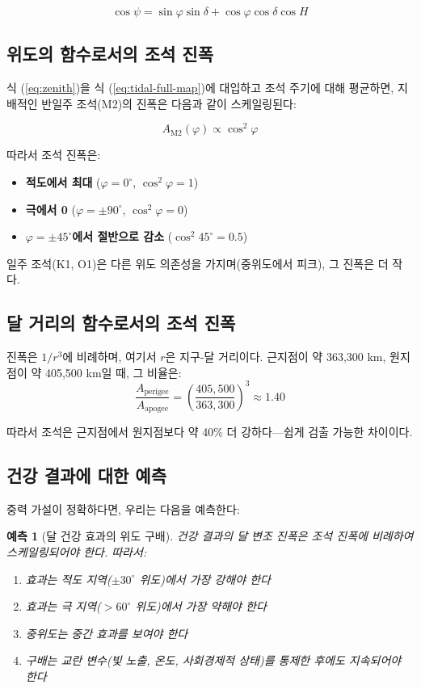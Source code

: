 \documentclass[12pt,a4paper]{article}
\newtheorem{prediction}[theorem]{예측}
\theoremstyle{remark}
\begin{document}
	\begin{equation}
		\cos\psi = \sin\varphi \sin\delta + \cos\varphi \cos\delta \cos H
		\label{eq:zenith}
	\end{equation}
	
	\subsection{위도의 함수로서의 조석 진폭}
	
	식 (\ref{eq:zenith})을 식 (\ref{eq:tidal-full-map})에 대입하고 조석 주기에 대해 평균하면, 지배적인 반일주 조석(M2)의 진폭은 다음과 같이 스케일링된다:
	
	\begin{equation}
		A_{\text{M2}}(\varphi) \propto \cos^2\varphi
		\label{eq:amplitude-latitude}
	\end{equation}
	
	따라서 조석 진폭은:
	\begin{itemize}
		\item \textbf{적도에서 최대} ($\varphi = 0^\circ$, $\cos^2\varphi = 1$)
		\item \textbf{극에서 0} ($\varphi = \pm 90^\circ$, $\cos^2\varphi = 0$)
		\item \textbf{$\varphi = \pm 45^\circ$에서 절반으로 감소} ($\cos^2 45^\circ = 0.5$)
	\end{itemize}
	
	일주 조석(K1, O1)은 다른 위도 의존성을 가지며(중위도에서 피크), 그 진폭은 더 작다.
	
	\subsection{달 거리의 함수로서의 조석 진폭}
	
	진폭은 $1/r^3$에 비례하며, 여기서 $r$은 지구-달 거리이다. 근지점이 약 363,300 km, 원지점이 약 405,500 km일 때, 그 비율은:
	\[
	\frac{A_{\text{perigee}}}{A_{\text{apogee}}} = \left(\frac{405,500}{363,300}\right)^3 \approx 1.40
	\]
	
	따라서 조석은 근지점에서 원지점보다 약 40\% 더 강하다—쉽게 검출 가능한 차이이다.
	
	\subsection{건강 결과에 대한 예측}
	
	중력 가설이 정확하다면, 우리는 다음을 예측한다:
	
	\begin{prediction}[달 건강 효과의 위도 구배]
		건강 결과의 달 변조 진폭은 조석 진폭에 비례하여 스케일링되어야 한다. 따라서:
		\begin{enumerate}
			\item 효과는 적도 지역(\(\pm 30^\circ\) 위도)에서 가장 강해야 한다
			\item 효과는 극 지역(\(>60^\circ\) 위도)에서 가장 약해야 한다
			\item 중위도는 중간 효과를 보여야 한다
			\item 구배는 교란 변수(빛 노출, 온도, 사회경제적 상태)를 통제한 후에도 지속되어야 한다
		\end{enumerate}
	\end{prediction}
	
\end{document}
